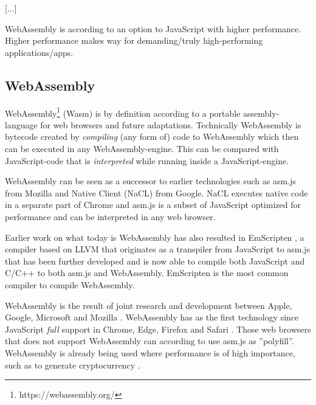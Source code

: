 [...]

WebAssembly is according to \textcite{HaasRossbergSchuffTitzerHolmanGohmanWagnerZakaiBastien2017} an option to JavaScript with higher performance. Higher performance makes way for demanding/truly high-performing applications/apps.

\subsection{WebAssembly}

WebAssembly\footnote{https://webassembly.org/} (Wasm) is by definition according to \textcite{HaasRossbergSchuffTitzerHolmanGohmanWagnerZakaiBastien2017} a portable assembly-language for web browsers and future adaptations. Technically WebAssembly is bytecode created by \emph{compiling} (any form of) code to WebAssembly \parencite{Watt2018} which then can be executed in any WebAssembly-engine. This can be compared with JavaScript-code that is \emph{interpreted} while running inside a JavaScript-engine.

WebAssembly can be seen as a successor to earlier technologies such as asm.js from Mozilla and Native Client (NaCL) from Google. NaCL executes native code in a separate part of Chrome and asm.js  \parencite{Zakai2018} is a subset of JavaScript optimized for performance \parencite{VanEsNicolayStievenartDHondtDeRoover2016} and can be interpreted in any web browser.

Earlier work on what today is WebAssembly has also resulted in EmScripten \parencite{Zakai2011}, a compiler based on LLVM \parencite{LattnerAdve2014} that originates as a transpiler from JavaScript to asm.js \parencite{Zakai2011} that has been further developed \parencite{HaasRossbergSchuffTitzerHolmanGohmanWagnerZakaiBastien2017} and is now able to compile both JavaScript and C/C++ to both asm.js and WebAssembly. EmScripten is the most common compiler to compile WebAssembly.

WebAssembly is the result of joint research and development between Apple, Google, Microsoft and Mozilla \parencite{HaasRossbergSchuffTitzerHolmanGohmanWagnerZakaiBastien2017}. WebAssembly has as the first technology since JavaScript \emph{full} support in Chrome, Edge, Firefox and Safari \parencite{Moller2018}. Those web browsers that does not support WebAssembly can according to \textcite{HaasRossbergSchuffTitzerHolmanGohmanWagnerZakaiBastien2017} use asm.js as ''polyfill''. WebAssembly is already being used where performance is of high importance, such as to generate cryptocurrency \parencite{RuthZimmermannWolsingHohlfeld2018}.

